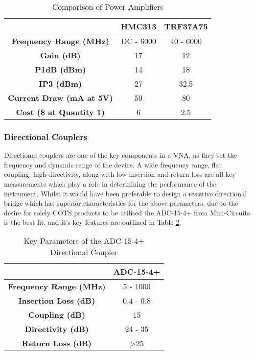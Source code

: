 \begin{table}[H]
	\caption{Comparison of Power Amplifiers}
	\label{table:power_amps}
	\centering
\begin{tabular}{|c|c|c|}
	\hline
	\multicolumn{1}{|l|}{}           & \textbf{HMC313} & \textbf{TRF37A75} \\ \hline
	\textbf{Frequency Range (MHz)}   & DC - 6000       & 40 - 6000         \\ \hline
	\textbf{Gain (dB)}               & 17              & 12                \\ \hline
	\textbf{P1dB (dBm)}              & 14              & 18                \\ \hline
	\textbf{IP3 (dBm)}               & 27              & 32.5              \\ \hline
	\textbf{Current Draw (mA at 5V)} & 50              & 80                \\ \hline
	\textbf{Cost (\$ at Quantity 1)} & 6               & 2.5               \\ \hline
\end{tabular}
\end{table}

\subsubsection{Directional Couplers}
Directional couplers are one of the key components in a VNA, as they set the frequency and dynamic range of the device. A wide frequency range, flat coupling, high directivity, along with low insertion and return loss are all key measurements which play a role in determining the performance of the instrument. Whilst it would have been preferable to design a resistive directional bridge which has superior characteristics for the above parameters, due to the desire for solely COTS products to be utilised the ADC-15-4+ from Mini-Circuits is the best fit, and it's key features are outlined in Table \ref{table:coupler}. 

\begin{table}[H]
	\caption{Key Parameters of the ADC-15-4+ Directional Coupler}
	\label{table:coupler}
	\centering
\begin{tabular}{|c|c|}
	\hline
	\multicolumn{1}{|l|}{}         & \textbf{ADC-15-4+} \\ \hline
	\textbf{Frequency Range (MHz)} & 5 - 1000           \\ \hline
	\textbf{Insertion Loss (dB)}   & 0.4 - 0.8          \\ \hline
	\textbf{Coupling (dB)}         & 15                 \\ \hline
	\textbf{Directivity (dB)}      & 24 - 35            \\ \hline
	\textbf{Return Loss (dB)}      & \textgreater 25    \\ \hline
\end{tabular}
\end{table}

